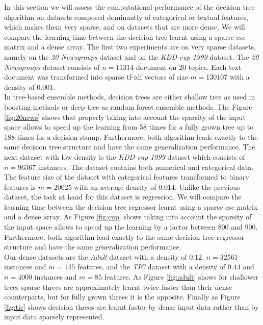 In this section we will assess the computational performance of the decision tree algorithm on datasets composed dominantly of categorical or textual features, which makes them very sparse, and on datasets that are more dense. We will compare the learning time between the decision tree learnt
using a sparse csc matrix and a dense array.
The first two experiments are on very sparse datasets, namely on the \emph{20 Newsgroups} dataset \cite{joachims1996probabilistic} and on the \emph{KDD cup 1999} dataset\cite{bay2000archive}. The \emph{20 Newsgroups} dataset
consists of $n=11314$ document on $20$ topics. Each text document was
transformed into sparse tf-idf vectors of size $m=130107$ with a density of
$0.001$. \\
In tree-based ensemble methods, decision trees are either shallow tree as used
in boosting methods or deep tree as random forest ensemble methods. The Figure
\ref{fig:20news} shows that properly taking into account the sparsity of the
input space allows to speed up the learning from 58 times for a fully grown
tree up to 188 times for a decision stump. Furthermore, both algorithm leads
exactly to the same decision tree structure and have the same generalization
performance. The next dataset with low density is the \emph{KDD cup 1999} dataset which consists of $n=96367$ instances. The dataset contains both numerical and categorical data. The feature size of the dataset with categorical features transformed to binary features is $m=20025$ with an average density of
$0.014$. Unlike the previous dataset, the task at hand for this dataset is regression. We will compare the learning time between the decision tree regressor learnt
using a sparse csc matrix and a dense array. As Figure \ref{fig:cup} shows taking into account the sparsity of the
input space allows to speed up the learning by a factor between 800 and 900. Furthermore, both algorithm lead
exactly to the same decision tree regressor structure and have the same generalization
performance.\\

Our dense datasets are the \emph{Adult} dataset\cite{Bache+Lichman:2013} with a density of $0.12$, $n=32561$ instances and  $m=145$ features, and the \emph{TIC} dataset\cite{Bache+Lichman:2013} with a density of $0.44$ and $n=4000$ instances and $m=85$ features. As Figure \ref{fig:adult} shows for shallower trees sparse threes are approximately learnt twice faster than their dense counterparts, but for fully grown threes it is the opposite. Finally as Figure \ref{fig:tic} shows decision threes are learnt faster by dense input data rather than by input data sparsely represented. 


